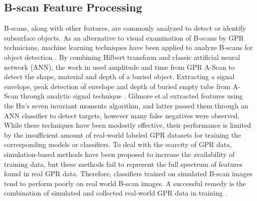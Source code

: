 \subsection{B-scan Feature Processing}
B-scans, along with other features, are commonly analyzed to detect or identify subsurface objects. As an alternative to visual examination of B-scans by GPR technicians, machine learning techniques have been applied to analyze B-scans for object detection \cite{Zhang2016UndergroundOC, 6576024, 7860619, DBLP, 6009168}. By combining Hilbert transform and classic artificial neural network (ANN), the work in \cite{Zhang2016UndergroundOC} used amplitude and time from GPR A-Scan to detect the shape, material and depth of a buried object. Extracting a signal envelope, peak detection of envelope and depth of buried empty tube from A-Scan through analytic signal technique \cite{8075631}. Gilmore et.al \cite{7860619} extracted features using the Hu's seven invariant moments algorithm, and latter passed them through an ANN classifier \cite{6576024} to detect targets, however many false negatives were observed. While these techniques have been modestly effective, their performance is limited by the insufficient amount of real-world labeled GPR datasets for training the corresponding models or classifiers. To deal with the scarcity of GPR data, simulation-based methods  have been proposed to increase the availability of training data, but these methods fail to represent the full spectrum of features found in real GPR data. Therefore, classifiers trained on simulated B-scan images tend to perform poorly on real world B-scan images. A successful remedy is the combination of simulated and collected real-world GPR data in training \cite{DBLP}.

